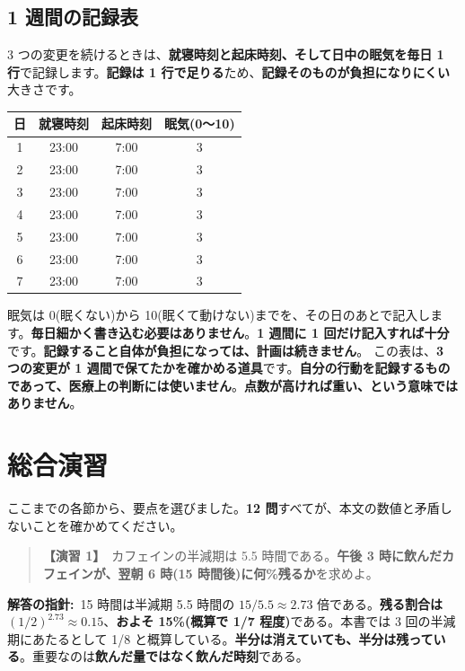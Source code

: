 \documentclass{article}
\begin{document}
\subsection{1 週間の記録表}

3 つの変更を続けるときは、\textbf{就寝時刻と起床時刻、そして日中の眠気を毎日 1 行}で記録します。\textbf{記録は 1 行で足りる}ため、\textbf{記録そのものが負担になりにくい}大きさです。
\begin{center}
\begin{tabular}{|c|c|c|c|}
\hline
日 & 就寝時刻 & 起床時刻 & 眠気(0〜10) \\
\hline
1 & 23:00 & 7:00 & 3 \\
\hline
2 & 23:00 & 7:00 & 3 \\
3 & 23:00 & 7:00 & 3 \\
\hline
4 & 23:00 & 7:00 & 3 \\
5 & 23:00 & 7:00 & 3 \\
\hline
6 & 23:00 & 7:00 & 3 \\
7 & 23:00 & 7:00 & 3 \\
\hline
\end{tabular}
\end{center}
眠気は 0(眠くない)から 10(眠くて動けない)までを、その日のあとで記入します。\textbf{毎日細かく書き込む必要はありません}。\textbf{1 週間に 1 回だけ記入すれば十分}です。\textbf{記録すること自体が負担になっては、計画は続きません}。
この表は、\textbf{3 つの変更が 1 週間で保てたかを確かめる道具}です。\textbf{自分の行動を記録するものであって、医療上の判断には使いません}。\textbf{点数が高ければ重い、という意味ではありません}。

\section{総合演習}

ここまでの各節から、要点を選びました。\textbf{12 問}すべてが、本文の数値と矛盾しないことを確かめてください。

\begin{quote}
\textbf{【演習 1】}\ カフェインの半減期は 5.5 時間である。\textbf{午後 3 時に飲んだカフェインが、翌朝 6 時(15 時間後)に何\%残るか}を求めよ。
\end{quote}

\textbf{解答の指針:}\ 15 時間は半減期 5.5 時間の \(15 / 5.5 \approx 2.73\) 倍である。\textbf{残る割合は \((1/2)^{2.73} \approx 0.15\)}、\textbf{およそ 15\%(概算で 1/7 程度)}である。本書では 3 回の半減期にあたるとして 1/8 と概算している。\textbf{半分は消えていても、半分は残っている}。重要なのは\textbf{飲んだ量ではなく飲んだ時刻}である。
\end{document}
